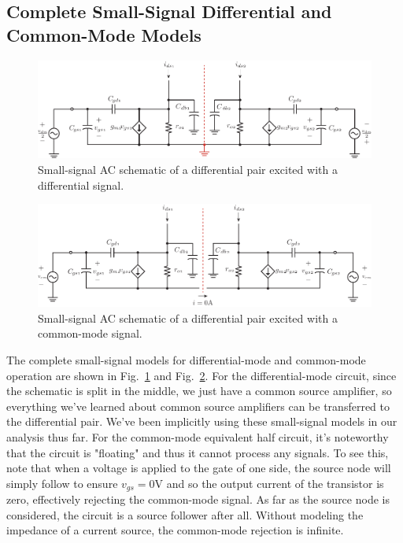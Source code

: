 \subsection{Complete Small-Signal Differential and Common-Mode Models}
\begin{figure}[tb]
\centering
\includegraphics[width=\columnwidth]{DM_symmetry_small_signal.pdf}
\caption{Small-signal AC schematic of a differential pair excited with a differential signal.} \label{fig:DM_symmetry_small_signal.pdf}
\end{figure}
\begin{figure}[tb]
\centering
\includegraphics[width=\columnwidth]{CM_symmetry_small_signal.pdf}
\caption{Small-signal AC schematic of a differential pair excited with a common-mode signal.} \label{fig:CM_symmetry_small_signal.pdf}
\end{figure}
The complete small-signal models for differential-mode and common-mode operation are shown in Fig.~\ref{fig:DM_symmetry_small_signal.pdf} and Fig.~\ref{fig:CM_symmetry_small_signal.pdf}.  For the differential-mode circuit, since the schematic is split in the middle, we just have a common source amplifier, so everything we've learned about common source amplifiers can be transferred to the differential pair.  We've been implicitly using these small-signal models in our analysis thus far.  For the common-mode equivalent half circuit, it's noteworthy that the circuit is "floating" and thus it cannot process any signals.  To see this, note that when a voltage is applied to the gate of one side, the source node will simply follow to ensure $v_{gs} = 0$V and so the output current of the transistor is zero, effectively rejecting the common-mode signal.  As far as the source node is considered, the circuit is a source follower after all.  Without modeling the impedance of a current source, the common-mode rejection is infinite.
